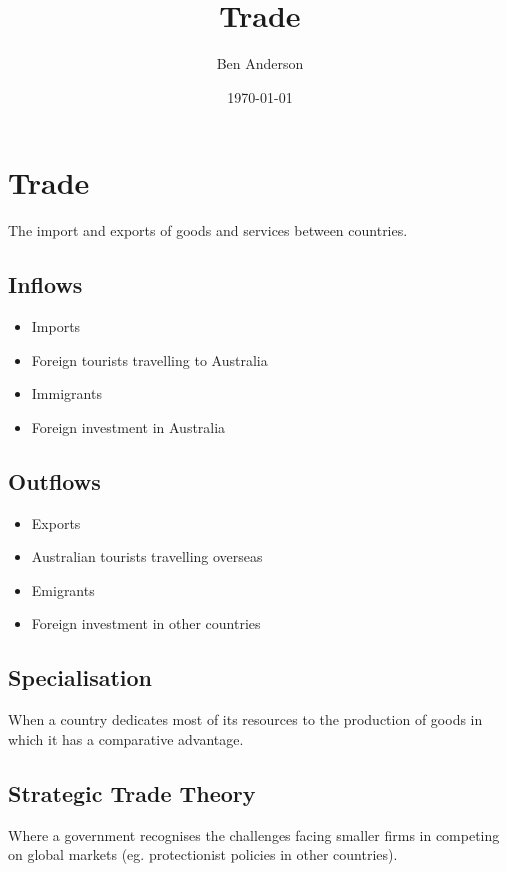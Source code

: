 \documentclass[a4paper,11pt]{article}
\begin{document}
\title{Trade}
\author{Ben Anderson}
\date{\today}
\maketitle
\pagebreak

\tableofcontents
\pagebreak


\section{Trade}

The import and exports of goods and services between countries.


\subsection{Inflows}

\begin{itemize}
\item Imports
\item Foreign tourists travelling to Australia
\item Immigrants
\item Foreign investment in Australia
\end{itemize}


\subsection{Outflows}

\begin{itemize}
\item Exports
\item Australian tourists travelling overseas
\item Emigrants
\item Foreign investment in other countries
\end{itemize}


\subsection{Specialisation}

When a country dedicates most of its resources to the production of goods in
which it has a comparative advantage.


\subsection{Strategic Trade Theory}

Where a government recognises the challenges facing smaller firms in competing
on global markets (eg. protectionist policies in other countries).
\end{document}
